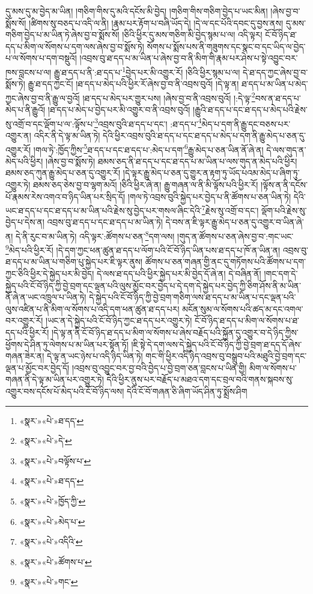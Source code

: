 དུ་མས་དུ་མ་བྱེད་མ་ཡིན། །གཅིག་གིས་དུ་མའི་དངོས་མི་བྱེད། །གཅིག་གིས་གཅིག་བྱེད་པ་ཡང་མིན། །ཞེས་བྱ་བ་སྨོས་སོ། །ཚིགས་སུ་བཅད་པ་འདི་ལ་ནི། །རྣམ་པར་རྟོག་པ་བཞི་ཡོད་དེ། །དེ་ལ་དང་པོའི་དབང་དུ་བྱས་ནས། དུ་མས་གཅིག་བྱེད་པ་མ་ཡིན་ཏེ་ཞེས་བྱ་བ་སྨོས་སོ། །ཅིའི་ཕྱིར་དུ་མས་གཅིག་མི་བྱེད་སྙམ་པ་ལ། འདི་ལྟར། ངོ་བོ་ཉིད་ཐ་དད་པ་མིག་ལ་སོགས་པ་དག་ལས་ཞེས་བྱ་བ་སྨོས་ཏེ། སོགས་པ་སྨོས་པས་ནི་གཟུགས་དང་སྣང་བ་དང་ཡིད་ལ་བྱེད་པ་ལ་སོགས་པ་དག་བསྡུའོ། །འབྲས་བུ་ཐ་དད་པ་མ་ཡིན་པ་ཞེས་བྱ་བ་ནི་མིག་གི་རྣམ་པར་ཤེས་པ་སྟེ་འབྱུང་བར་ཁས་བླངས་པ་ལ། རྒྱུ་ཐ་དད་པ་ནི་:ཐ་དད་པ་\footnote{«སྣར་»«པེ་»ཐ་དད་}བྱེད་པར་མི་འགྱུར་རོ། །ཅིའི་ཕྱིར་སྙམ་པ་ལ། དེ་ཐ་དད་ཀྱང་ཞེས་བྱ་བ་སྨོས་ཏེ། རྒྱུ་ཐ་དད་ཀྱང་ངོ། །ཐ་དད་པ་མེད་པའི་ཕྱིར་རོ་ཞེས་བྱ་བ་ནི་འབྲས་བུའོ། །དེ་ལྟ་ན། ཐ་དད་པ་མ་ཡིན་པ་མེད་ཀྱང་ཞེས་བྱ་བ་ནི་རྒྱུ་ལ་བྱའོ། །ཐ་དད་པ་མེད་པར་གྱུར་པས། །ཞེས་བྱ་བ་ནི་འབྲས་བུའོ། །:དེ་ལྟ་\footnote{«སྣར་»«པེ་»དེ་}བས་ན་ཐ་དད་པ་མེད་པ་ནི་རྒྱུའོ། །ཐ་དད་པ་མེད་པ་བྱེད་པར་མི་འགྱུར་བ་ནི་འབྲས་བུའོ། །རྒྱུའི་ཐ་དད་པ་དང་ཐ་དད་པ་མེད་པའི་རྗེས་སུ་འགྲོ་བ་དང་ལྡོག་པ་ལ་:ལྟོས་པ་\footnote{«སྣར་»«པེ་»བལྟོས་པ་}འབྲས་བུའི་ཐ་དད་པ་དང་། :ཐ་དད་པ་\footnote{«སྣར་»«པེ་»ཐ་དད་}མེད་པ་དག་ནི་རྒྱུ་དང་བཅས་པར་འགྱུར་ན། འདིར་ནི་དེ་ལྟ་མ་ཡིན་ཏེ། དེའི་ཕྱིར་འབྲས་བུའི་ཐ་དད་པ་དང་ཐ་དད་པ་མེད་པ་དག་ནི་རྒྱུ་མེད་པ་ཅན་དུ་འགྱུར་རོ། །གལ་ཏེ་:ཁྱོད་ཀྱིས་\footnote{«སྣར་»«པེ་»ཁྱོད་ཀྱི་}ཐ་དད་པ་དང་ཐ་དད་པ་:མེད་པ་དག་\footnote{«སྣར་»«པེ་»མེད་པ་}རྒྱུ་མེད་པ་ཅན་ཡིན་ནོ་ཞེ་ན། དེ་ལས་གུད་ན་མེད་པའི་ཕྱིར། །ཞེས་བྱ་བ་སྨོས་ཏེ། ཐམས་ཅད་ནི་ཐ་དད་པ་དང་ཐ་དད་པ་མ་ཡིན་པ་ལས་གུད་ན་མེད་པའི་ཕྱིར། ཐམས་ཅད་ཀུན་རྒྱུ་མེད་པ་ཅན་དུ་འགྱུར་རོ། །དེ་ལྟར་རྒྱུ་མེད་པ་ཅན་དུ་གྱུར་ན་རྟག་ཏུ་ཡོད་པའམ་མེད་པ་ཞིག་ཏུ་འགྱུར་ཏེ། ཐམས་ཅད་ཅེས་བྱ་བ་ལྷག་མའོ། །ཅིའི་ཕྱིར་ཞེ་ན། རྒྱུ་གཞན་ལ་ནི་མི་ལྟོས་པའི་ཕྱིར་རོ། །ལྟོས་ན་ནི་དངོས་པོ་རྣམས་རེས་འགའ་བ་ཉིད་ཡིན་པར་སྲིད་དོ། །གལ་ཏེ་འབྲས་བུའི་སྐྱེད་པར་བྱེད་པ་ནི་ཚོགས་པ་ཅན་ཡིན་ཏེ། དེའི་ཡང་ཐ་དད་པ་དང་ཐ་དད་པ་མ་ཡིན་པའི་རྗེས་སུ་བྱེད་པར་གསལ་ཞིང་དེའི་\footnote{«སྣར་»«པེ་»འདིའི་}རྗེས་སུ་འགྲོ་བ་དང་། ལྡོག་པའི་རྗེས་སུ་བྱེད་པ་དེས་ན། འབྲས་བུ་ཐ་དད་པ་དང་ཐ་དད་པ་མ་ཡིན་ཏེ། དེ་བས་ན་ཇི་ལྟར་རྒྱུ་མེད་པ་ཅན་དུ་འགྱུར་བ་ཡིན་ཞེ་ན། དེ་ནི་རུང་བ་མ་ཡིན་ཏེ། འདི་ལྟར་:ཚོགས་པ་ཅན་\footnote{«སྣར་»«པེ་»ཚོགས་པ་}དག་ལས། །གུད་ན་ཚོགས་པ་ཅན་ཞེས་བྱ་བ་:གང་ཡང་\footnote{«སྣར་»«པེ་»གང་}མེད་པའི་ཕྱིར་རོ། །དེ་དག་ཀྱང་ཕན་ཚུན་ཐ་དད་པ་ལོག་པའི་ངོ་བོ་ཉིད་ཡིན་པས་ཐ་དད་པ་ཁོ་ན་ཡིན་ན། འབྲས་བུ་ཐ་དད་པ་མ་ཡིན་པ་གཅིག་པུ་སྐྱེད་པར་ཇི་ལྟར་ནུས། ཚོགས་པ་ཅན་གཞན་གྱི་ནང་དུ་གཏོགས་པའི་ཚོགས་པ་དག་ཀྱང་ཅིའི་ཕྱིར་དེ་སྐྱེད་པར་མི་བྱེད། དེ་ལས་ཐ་དད་པའི་ཕྱིར་སྐྱེད་པར་མི་བྱེད་དོ་ཞེ་ན། དེ་བཞིན་ནོ། །གང་དག་དེ་སྐྱེད་པའི་ངོ་བོ་ཉིད་ཀྱི་བྱེ་བྲག་དང་ལྡན་པའི་ལུས་མྱོང་བར་བྱེད་པ་དེ་དག་དེ་སྐྱེད་པར་བྱེད་ཀྱི་ཅིག་ཤོས་ནི་མ་ཡིན་ནོ་ཞེ་ན་ཡང་འཁྲུལ་པ་ཡིན་ཏེ། དེ་སྐྱེད་པའི་ངོ་བོ་ཉིད་ཀྱི་བྱེ་བྲག་གཅིག་ལས་ཐ་དད་པ་མ་ཡིན་པ་དང་ལྡན་པའི་ལུས་འཛིན་པ་ནི་མིག་ལ་སོགས་པ་འདི་དག་ཕན་ཚུན་ཐ་དད་པར། མངོན་སུམ་ལ་སོགས་པའི་ཚད་མ་དང་འགལ་བར་འགྱུར་རོ། །ཡང་ན་དེ་སྐྱེད་པའི་ངོ་བོ་ཉིད་ཀྱང་ཐ་དད་པར་འགྱུར་ཏེ། ངོ་བོ་ཉིད་ཐ་དད་པ་མིག་ལ་སོགས་པ་ཐ་དད་པའི་ཕྱིར་རོ། །དེ་ལྟ་ན་ནི་ངོ་བོ་ཉིད་ཐ་དད་པ་མིག་ལ་སོགས་པ་ཞེས་བརྗོད་པའི་སྐྱོན་དུ་འགྱུར་བ་དེ་ཉིད་ཀྱིས་ཕྱོགས་དེ་ཤིན་ཏུ་ལེགས་པ་མ་ཡིན་པར་སྟོན་ཏོ། །ཇི་སྟེ་དེ་དག་ལས་དེ་སྐྱེད་པའི་ངོ་བོ་ཉིད་ཀྱི་བྱེ་བྲག་ཐ་དད་དོ་ཞེས་གཞན་ཟེར་ན། དེ་ལྟ་ན་ཡང་ཉེས་པ་འདི་ཉིད་ཡིན་ཏེ། གང་གི་ཕྱིར་འདི་ཉིད་འབྲས་བུ་བསྒྲུབ་པའི་མཐུའི་བྱེ་བྲག་དང་ལྡན་པ་མྱོང་བར་བྱེད་དོ། །འབྲས་བུ་འབྱུང་བར་བྱ་བའི་བྱེད་པ་བྱེ་བྲག་ཅན་བླངས་པ་ཡིན་གྱི། མིག་ལ་སོགས་པ་གཞན་ནི་དེ་ལྟ་མ་ཡིན་པར་འགྱུར་ཏེ། དེའི་ཕྱིར་ནུས་པར་བརྗོད་པ་མཐའ་དག་དང་བྲལ་བའི་གནས་སྐབས་སུ་འགྱུར་བས་དངོས་པོ་མེད་པའི་ངོ་བོ་ཉིད་ལས། དེའི་ངོ་བོ་གཞན་ཅི་ཞིག་ཡོད་ཤིན་ཏུ་སྨྲོས་ཤིག 